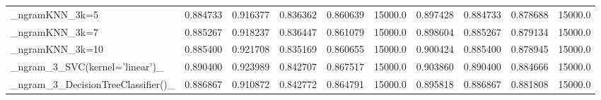 \begin{tabular}{lrrrrrrrrr}
\_ngramKNN\_3k=5                                     &  0.884733 &         0.916377 &      0.836362 &        0.860639 &        15000.0 &            0.897428 &         0.884733 &           0.878688 &           15000.0 \\
\_ngramKNN\_3k=7                                     &  0.885267 &         0.918237 &      0.836447 &        0.861079 &        15000.0 &            0.898604 &         0.885267 &           0.879134 &           15000.0 \\
\_ngramKNN\_3k=10                                    &  0.885400 &         0.921708 &      0.835169 &        0.860655 &        15000.0 &            0.900424 &         0.885400 &           0.878945 &           15000.0 \\
\_ngram\_3\_SVC(kernel='linear')\_                     &  0.890400 &         0.923989 &      0.842707 &        0.867517 &        15000.0 &            0.903860 &         0.890400 &           0.884666 &           15000.0 \\
\_ngram\_3\_DecisionTreeClassifier()\_                 &  0.886867 &         0.910872 &      0.842772 &        0.864791 &        15000.0 &            0.895818 &         0.886867 &           0.881808 &           15000.0 \\
\bottomrule
\end{tabular}
